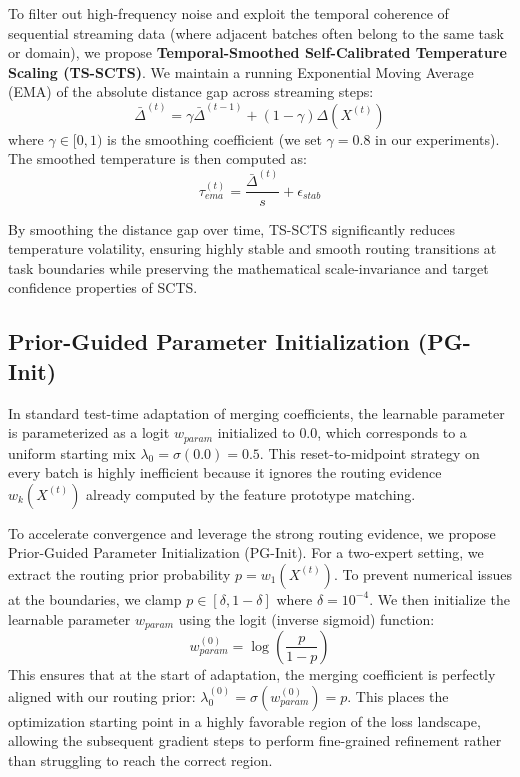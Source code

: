 \documentclass{article}
\theoremstyle{plain}
\theoremstyle{definition}
\theoremstyle{remark}
\begin{document}
To filter out high-frequency noise and exploit the temporal coherence of sequential streaming data (where adjacent batches often belong to the same task or domain), we propose \textbf{Temporal-Smoothed Self-Calibrated Temperature Scaling (TS-SCTS)}. We maintain a running Exponential Moving Average (EMA) of the absolute distance gap across streaming steps:
\begin{equation}
  \bar{\Delta}^{(t)} = \gamma \bar{\Delta}^{(t-1)} + (1 - \gamma) \Delta(X^{(t)})
\end{equation}
where $\gamma \in [0, 1)$ is the smoothing coefficient (we set $\gamma = 0.8$ in our experiments). The smoothed temperature is then computed as:
\begin{equation}
  \tau_{ema}^{(t)} = \frac{\bar{\Delta}^{(t)}}{s} + \epsilon_{stab}
\end{equation}

By smoothing the distance gap over time, TS-SCTS significantly reduces temperature volatility, ensuring highly stable and smooth routing transitions at task boundaries while preserving the mathematical scale-invariance and target confidence properties of SCTS.

\subsection{Prior-Guided Parameter Initialization (PG-Init)}

In standard test-time adaptation of merging coefficients, the learnable parameter is parameterized as a logit $w_{param}$ initialized to $0.0$, which corresponds to a uniform starting mix $\lambda_0 = \sigma(0.0) = 0.5$. This reset-to-midpoint strategy on every batch is highly inefficient because it ignores the routing evidence $w_k(X^{(t)})$ already computed by the feature prototype matching.

To accelerate convergence and leverage the strong routing evidence, we propose Prior-Guided Parameter Initialization (PG-Init). For a two-expert setting, we extract the routing prior probability $p = w_1(X^{(t)})$. To prevent numerical issues at the boundaries, we clamp $p \in [\delta, 1 - \delta]$ where $\delta = 10^{-4}$. We then initialize the learnable parameter $w_{param}$ using the logit (inverse sigmoid) function:
\begin{equation}
  w_{param}^{(0)} = \log \left( \frac{p}{1 - p} \right)
\end{equation}
This ensures that at the start of adaptation, the merging coefficient is perfectly aligned with our routing prior: $\lambda_0^{(0)} = \sigma(w_{param}^{(0)}) = p$. This places the optimization starting point in a highly favorable region of the loss landscape, allowing the subsequent gradient steps to perform fine-grained refinement rather than struggling to reach the correct region.
\end{document}
